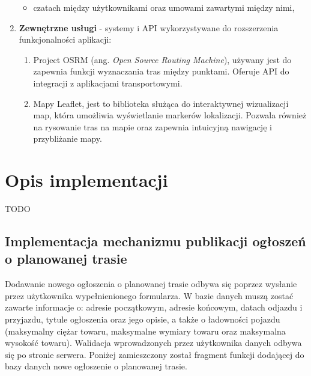 \begin{enumerate}
\begin{itemize}
        \item czatach między użytkownikami oraz umowami zawartymi między nimi,
    \end{itemize}
    \item \textbf{Zewnętrzne usługi} - systemy i API wykorzystywane do rozszerzenia funkcjonalności aplikacji:
    \begin{enumerate}
        \item Project OSRM (ang. \emph{Open Source Routing Machine}), używany jest do zapewnia funkcji wyznaczania tras między punktami. Oferuje API do integracji z aplikacjami transportowymi.
        \item Mapy Leaflet, jest to biblioteka służąca do interaktywnej wizualizacji map, która umożliwia wyświetlanie markerów lokalizacji. Pozwala również na rysowanie tras na mapie oraz zapewnia intuicyjną nawigację i przybliżanie mapy.
    \end{enumerate}
\end{enumerate}

\section{Opis implementacji}
TODO

\subsection{Implementacja mechanizmu publikacji ogłoszeń o planowanej trasie}
\label{addAnnouncement}
Dodawanie nowego ogłoszenia o planowanej trasie odbywa się poprzez wysłanie przez użytkownika wypełnienionego formularza. W bazie danych muszą zostać zawarte informacje o: adresie początkowym, adresie końcowym, datach odjazdu i przyjazdu, tytule ogłoszenia oraz jego opisie, a także o ładowności pojazdu (maksymalny ciężar towaru, maksymalne wymiary towaru oraz maksymalna wysokość towaru). Walidacja wprowadzonych przez użytkownika danych odbywa się po stronie serwera. Poniżej zamieszczony został fragment funkcji dodającej do bazy danych nowe ogłoszenie o planowanej trasie.

